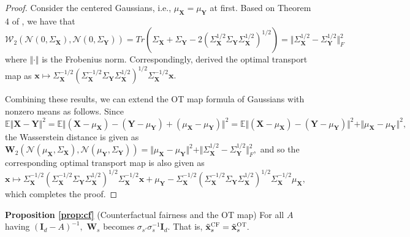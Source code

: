 \documentclass[10pt]{article} %
\newtheorem{proposition}[theorem]{Proposition}
\begin{document}
\begin{proof}
    Consider the centered Gaussians, i.e., $\mu_{\mathbf{X}} = \mu_{\mathbf{Y}}$ at first.
    Based on Theorem 4 of \citet{OLKIN1982257}, we have that $\mathcal{W}_{2} \left( \mathcal{N} (0, \Sigma_{\mathbf{X}}), \mathcal{N} (0, \Sigma_{\mathbf{Y}}) \right) = Tr ( \Sigma_{\mathbf{X}} + \Sigma_{\mathbf{Y}} - 2 \left( \Sigma_{\mathbf{X}}^{1/2} \Sigma_{\mathbf{Y}} \Sigma_{\mathbf{X}}^{1/2} \right)^{1/2} ) = \Vert \Sigma_{\mathbf{X}}^{1/2} - \Sigma_{\mathbf{Y}}^{1/2} \Vert_{F}^{2}$
    where $\Vert \cdot \Vert$ is the Frobenius norm.
    Correspondingly, \citet{Knott1984OnTO} derived the optimal transport map as $\mathbf{x} \mapsto \Sigma_{\mathbf{X}}^{-1/2} \left( \Sigma_{\mathbf{X}}^{-1/2} \Sigma_{\mathbf{Y}} \Sigma_{\mathbf{X}}^{1/2} \right)^{1/2} \Sigma_{\mathbf{X}}^{-1/2} \mathbf{x}.$
    
    Combining these results, we can extend the OT map formula of Gaussians with nonzero means as follows.
    Since
    $\mathbb{E} \Vert \mathbf{X} - \mathbf{Y} \Vert^{2} = \mathbb{E} \Vert \left( \mathbf{X} - \mu_{\mathbf{X}} \right) - \left( \mathbf{Y} - \mu_{\mathbf{Y}} \right) + \left( \mu_{\mathbf{X}} - \mu_{\mathbf{Y}} \right) \Vert^{2} = \mathbb{E} \Vert \left( \mathbf{X} - \mu_{\mathbf{X}} \right) - \left( \mathbf{Y} - \mu_{\mathbf{Y}} \right) \Vert^{2} + \Vert \mu_{\mathbf{X}} - \mu_{\mathbf{Y}} \Vert^{2},$
    the Wasserstein distance is given as $\mathbf{W}_{2} \left( \mathcal{N} (\mu_{\mathbf{X}}, \Sigma_{\mathbf{X}}), \mathcal{N} (\mu_{\mathbf{Y}}, \Sigma_{\mathbf{Y}}) \right) = \Vert \mu_{\mathbf{X}} - \mu_{\mathbf{Y}} \Vert^{2} + \Vert \Sigma_{\mathbf{X}}^{1/2} - \Sigma_{\mathbf{Y}}^{1/2} \Vert_{F}^{2},$
    and so the corresponding optimal transport map is also given as $\mathbf{x} \mapsto \Sigma_{\mathbf{X}}^{-1/2} \left( \Sigma_{\mathbf{X}}^{-1/2} \Sigma_{\mathbf{Y}} \Sigma_{\mathbf{X}}^{1/2} \right)^{1/2} \Sigma_{\mathbf{X}}^{-1/2} \mathbf{x} + \mu_{\mathbf{Y}} - \Sigma_{\mathbf{X}}^{-1/2} \left( \Sigma_{\mathbf{X}}^{-1/2} \Sigma_{\mathbf{Y}} \Sigma_{\mathbf{X}}^{1/2} \right)^{1/2} \Sigma_{\mathbf{X}}^{-1/2} \mu_{\mathbf{X}},$
    which completes the proof.
\end{proof}

\textbf{Proposition \ref{prop:cf}} (Counterfactual fairness and the OT map)
    For all $A$ having $(\mathbf{I}_{d}-A)^{-1},$
    $\mathbf{W}_s$ becomes $ \sigma_{s'} \sigma_{s}^{-1} \mathbf{I}_{d}.$
    That is, $\tilde{\mathbf{x}}_{s}^{\textsc{CF}} = \tilde{\mathbf{x}}_{s}^{\textsc{OT}}.$
\end{document}
